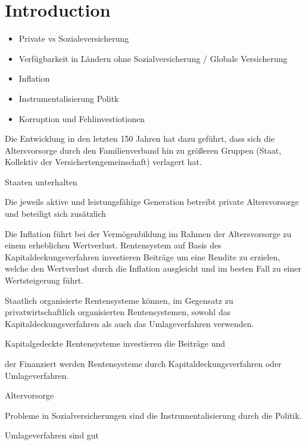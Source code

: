\section{Introduction}

\begin{itemize}
\item Private vs Sozialeversicherung
\item Verfügbarkeit in Ländern ohne Sozialversicherung / Globale Versicherung
\item Inflation
\item Instrumentalisierung Politk
\item Korruption und Fehlinvestiotionen
\end{itemize}

Die Entwicklung in den letzten 150 Jahren hat dazu geführt, dass sich die Altersvorsorge durch den Familienverband hin zu größeren Gruppen (Staat, Kollektiv der Versichertengemeinschaft) verlagert hat. 

Staaten unterhalten 

Die jeweils aktive und leistungsfähige Generation betreibt private Altersvorsorge und beteiligt sich zusätzlich 

Die Inflation führt bei der Vermögenbildung im Rahmen der Altersvorsorge zu einem erheblichen Wertverlust. 
Rentensystem auf Basis des Kapitaldeckungsverfahren investieren Beiträge um eine Rendite zu erzielen, welche den Wertverlust durch die Inflation ausgleicht und im besten Fall zu einer Wertsteigerung führt.





Staatlich organisierte Rentensysteme können, im Gegensatz zu privatwirtschaftlich organisierten Rentensystemen, sowohl das Kapitaldeckungsverfahren als auch das Umlageverfahren verwenden. 



Kapitalgedeckte Rentensysteme investieren die Beiträge und 

 der Finanziert werden Rentensysteme durch Kapitaldeckungsverfahren oder Umlageverfahren.



Altervorsorge 

Probleme in Sozialversicherungen sind die Instrumentalisierung durch die Politik.

Umlageverfahren sind gut 


